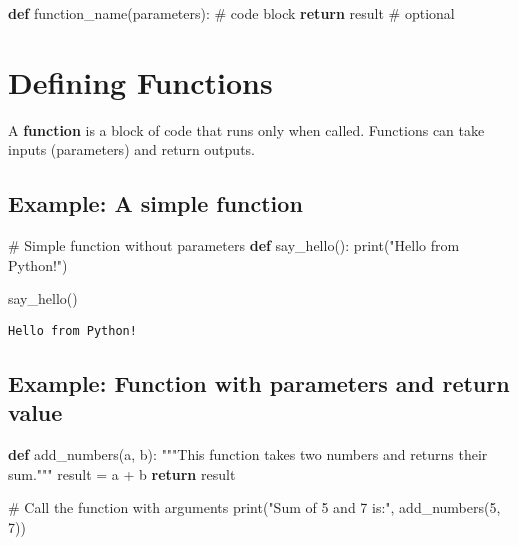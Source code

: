 \documentclass[
  11pt,
  letterpaper,
]{book}
\newenvironment{Shaded}{\begin{snugshade}}{\end{snugshade}}
\newcommand{\BuiltInTok}[1]{\textcolor[rgb]{0.00,0.23,0.31}{#1}}
\newcommand{\CommentTok}[1]{\textcolor[rgb]{0.37,0.37,0.37}{#1}}
\newcommand{\ControlFlowTok}[1]{\textcolor[rgb]{0.00,0.23,0.31}{\textbf{#1}}}
\newcommand{\DecValTok}[1]{\textcolor[rgb]{0.68,0.00,0.00}{#1}}
\newcommand{\KeywordTok}[1]{\textcolor[rgb]{0.00,0.23,0.31}{\textbf{#1}}}
\newcommand{\NormalTok}[1]{\textcolor[rgb]{0.00,0.23,0.31}{#1}}
\newcommand{\OperatorTok}[1]{\textcolor[rgb]{0.37,0.37,0.37}{#1}}
\newcommand{\StringTok}[1]{\textcolor[rgb]{0.13,0.47,0.30}{#1}}
\begin{document}
\begin{Shaded}
\begin{Highlighting}[]
\KeywordTok{def}\NormalTok{ function\_name(parameters):}
    \CommentTok{\# code block}
    \ControlFlowTok{return}\NormalTok{ result   }\CommentTok{\# optional}
\end{Highlighting}
\end{Shaded}

\section{Defining Functions}\label{defining-functions-1}

A \textbf{function} is a block of code that runs only when called.
Functions can take inputs (parameters) and return outputs.

\subsection{Example: A simple function}\label{example-a-simple-function}

\begin{Shaded}
\begin{Highlighting}[]
\CommentTok{\# Simple function without parameters}
\KeywordTok{def}\NormalTok{ say\_hello():}
    \BuiltInTok{print}\NormalTok{(}\StringTok{"Hello from Python!"}\NormalTok{)}

\NormalTok{say\_hello()}
\end{Highlighting}
\end{Shaded}

\begin{verbatim}
Hello from Python!
\end{verbatim}

\subsection{Example: Function with parameters and return
value}\label{example-function-with-parameters-and-return-value}

\begin{Shaded}
\begin{Highlighting}[]
\KeywordTok{def}\NormalTok{ add\_numbers(a, b):}
    \CommentTok{"""This function takes two numbers and returns their sum."""}
\NormalTok{    result }\OperatorTok{=}\NormalTok{ a }\OperatorTok{+}\NormalTok{ b}
    \ControlFlowTok{return}\NormalTok{ result}

\CommentTok{\# Call the function with arguments}
\BuiltInTok{print}\NormalTok{(}\StringTok{"Sum of 5 and 7 is:"}\NormalTok{, add\_numbers(}\DecValTok{5}\NormalTok{, }\DecValTok{7}\NormalTok{))}
\end{Highlighting}
\end{Shaded}
\end{document}
